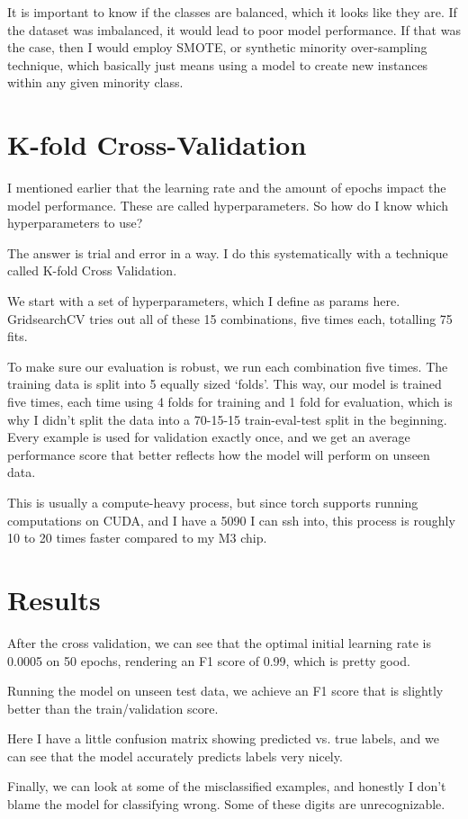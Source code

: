 \documentclass{article}
\begin{document}
It is important to know if the classes are balanced, which it looks like they are. If the dataset was imbalanced, it would lead to poor model performance. If that was the case, then I would employ SMOTE, or synthetic minority over-sampling technique, which basically just means using a model to create new instances within any given minority class.

\section{K-fold Cross-Validation}

I mentioned earlier that the learning rate and the amount of epochs impact the model performance. These are called hyperparameters. So how do I know which hyperparameters to use? 

The answer is trial and error in a way. I do this systematically with a technique called K-fold Cross Validation.

We start with a set of hyperparameters, which I define as params here. GridsearchCV tries out all of these 15 combinations, five times each, totalling 75 fits. 

To make sure our evaluation is robust, we run each combination five times. The training data is split into 5 equally sized `folds'. This way, our model is trained five times, each time using 4 folds for training and 1 fold for evaluation, which is why I didn't split the data into a 70-15-15 train-eval-test split in the beginning. Every example is used for validation exactly once, and we get an average performance score that better reflects how the model will perform on unseen data. 

This is usually a compute-heavy process, but since torch supports running computations on CUDA, and I have a 5090 I can ssh into, this process is roughly 10 to 20 times faster compared to my M3 chip. 

\newpage

\section{Results}

After the cross validation, we can see that the optimal initial learning rate is 0.0005 on 50 epochs, rendering an F1 score of 0.99, which is pretty good. 

Running the model on unseen test data, we achieve an F1 score that is slightly better than the train/validation score. 

Here I have a little confusion matrix showing predicted vs. true labels, and we can see that the model accurately predicts labels very nicely. 

Finally, we can look at some of the misclassified examples, and honestly I don't blame the model for classifying wrong. Some of these digits are unrecognizable. 
\end{document}

